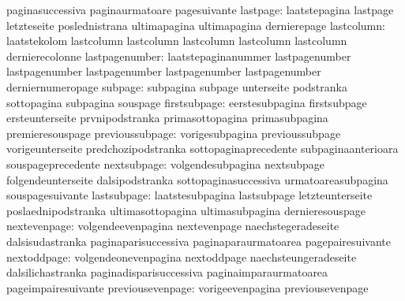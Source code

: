                            paginasuccessiva          paginaurmatoare
                           pagesuivante
                 lastpage: laatstepagina             lastpage
                           letzteseite               poslednistrana
                           ultimapagina              ultimapagina
                           dernierepage
               lastcolumn: laatstekolom              lastcolumn
                           lastcolumn                lastcolumn
                           lastcolumn                lastcolumn
                           dernierecolonne
           lastpagenumber: laatstepaginanummer       lastpagenumber
                           lastpagenumber            lastpagenumber
                           lastpagenumber            lastpagenumber
                           derniernumeropage
                  subpage: subpagina                 subpage
                           unterseite                podstranka
                           sottopagina               subpagina
                           souspage
             firstsubpage: eerstesubpagina           firstsubpage
                           ersteunterseite           prvnipodstranka
                           primasottopagina          primasubpagina
                           premieresouspage
          previoussubpage: vorigesubpagina           previoussubpage
                           vorigeunterseite          predchozipodstranka
                           sottopaginaprecedente     subpaginaanterioara
                           souspageprecedente
              nextsubpage: volgendesubpagina         nextsubpage
                           folgendeunterseite        dalsipodstranka
                           sottopaginasuccessiva     urmatoareasubpagina
                           souspagesuivante
              lastsubpage: laatstesubpagina          lastsubpage
                           letzteunterseite          poslaednipodstranka
                           ultimasottopagina         ultimasubpagina
                           dernieresouspage
             nextevenpage: volgendeevenpagina        nextevenpage
                           naechstegeradeseite       dalsisudastranka
                           paginaparisuccessiva      paginaparaurmatoarea
                           pagepairesuivante
              nextoddpage: volgendeonevenpagina      nextoddpage
                           naechsteungeradeseite     dalsilichastranka
                           paginadisparisuccessiva   paginaimparaurmatoarea
                           pageimpairesuivante
         previousevenpage: vorigeevenpagina          previousevenpage
